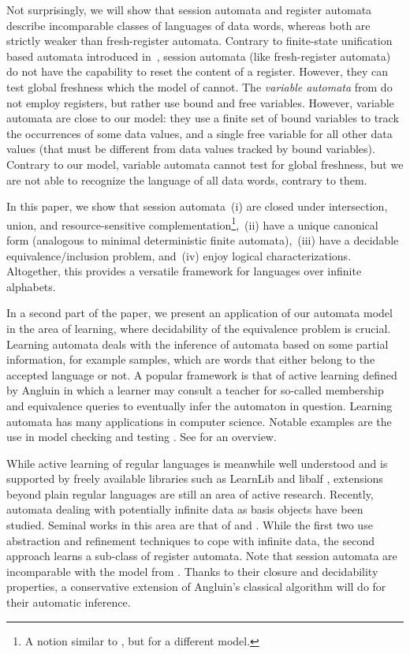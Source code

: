 \documentclass{LMCS}
\begin{document}
Not surprisingly, we will show that session automata and register automata
describe incomparable classes of languages of data words, whereas both
are strictly weaker than fresh-register automata. Contrary to
finite-state unification based automata introduced in~\cite{KamTan06},
session automata (like fresh-register automata) do not have the
capability to reset the content of a register. However, they can test
global freshness which the model of \cite{KamTan06} cannot. The
\emph{variable automata} from \cite{DBLP:conf/lata/GrumbergKS10} do not
employ registers, but rather use bound and free
variables. However, variable automata are close to our model: they use a
finite set of bound variables to track the occurrences of some data values, and a
single free variable for all other data values (that must be different
from data values tracked by bound variables). Contrary to our model,
variable automata cannot test for global freshness, but we are not
able to recognize the language of all data words, contrary to them.

In this paper, we show that session automata
\,(i) are closed under intersection, union, and resource-sensitive
  complementation\footnote{A notion similar to \cite{KST2012}, but for
    a different model.},
\,(ii) have a unique canonical form (analogous to minimal deterministic
  finite automata),
\,(iii) have a decidable equivalence/inclusion problem, and
\,(iv) enjoy logical characterizations.
Altogether, this provides a versatile framework for languages over
infinite alphabets.

In a second part of the paper, we present an application of our
automata model in the area of learning, where decidability of the
equivalence problem is crucial.  Learning automata deals with the
inference of automata based on some partial information, for example
samples, which are words that either belong to the accepted language
or not. A popular framework is that of active learning defined by
Angluin \cite{Angluin:regset} in which a learner may consult a teacher
for so-called membership and equivalence queries to eventually infer
the automaton in question.  Learning automata has many applications in
computer science. Notable examples are the use in model checking
\cite{DBLP:conf/sigsoft/GiannakopoulouM03} and testing
\cite{BergGJLRS05}. See \cite{DBLP:conf/fmco/Leucker07} for an
overview.

While active learning of regular languages is meanwhile well
understood and is supported by freely available libraries such as
LearnLib \cite{MRSL07} and libalf \cite{BKKLNP10}, extensions beyond
plain regular languages are still an area of active
research. Recently, automata dealing with potentially infinite data as
basis objects have been studied. Seminal works in this area are that
of \cite{DBLP:conf/fm/AartsHKOV12,DBLP:conf/sfm/Jonsson11} and
\cite{HowarSJC12}. While the first two use abstraction and refinement
techniques to cope with infinite data, the second approach learns a
sub-class of register automata.  Note that session automata are
incomparable with the model from \cite{HowarSJC12}.  Thanks to their
closure and decidability properties, a conservative extension of
Angluin's classical algorithm will do for their automatic inference.
\end{document}
